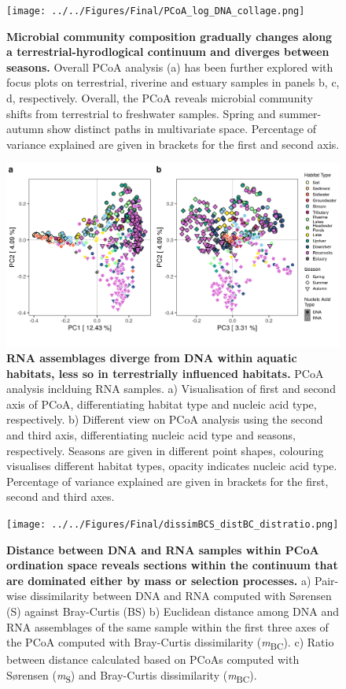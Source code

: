 \documentclass[12pt,a4paper]{article} %
\begin{document}
\begin{figure}[!ht]
\centering
\texttt{[image: ../../Figures/Final/PCoA\_log\_DNA\_collage.png]}
\caption{\textbf{Microbial community composition gradually changes along a terrestrial-hyrodlogical continuum and diverges between seasons.} Overall PCoA analysis (a) has been further explored with focus plots on terrestrial, riverine and estuary samples in panels b, c, d, respectively. Overall, the PCoA reveals microbial community shifts from terrestrial to freshwater samples. Spring and summer-autumn show distinct paths in multivariate space. Percentage of variance explained are given in brackets for the first and second axis.}
\end{figure}

\begin{figure}[!ht]
\centering
\includegraphics[width=17cm]{../../Figures/Final/PCoA_all_SampleType.png}
\caption{\textbf{RNA assemblages diverge from DNA within aquatic habitats, less so in terrestrially influenced habitats.} PCoA analysis inclduing RNA samples. a) Visualisation of first and second axis of PCoA, differentiating habitat type and nucleic acid type, respectively. b) Different view on PCoA analysis using the second and third axis, differentiating nucleic acid type and seasons, respectively. Seasons are given in different point shapes, colouring visualises different habitat types, opacity indicates nucleic acid type. Percentage of variance explained are given in brackets for the first, second and third axes.}
\end{figure}

\begin{figure}[!ht]
\centering
\texttt{[image: ../../Figures/Final/dissimBCS\_distBC\_distratio.png]}
\caption{\textbf{Distance between DNA and RNA samples within PCoA ordination space reveals sections within the continuum that are dominated either by mass or selection processes.} a) Pair-wise dissimilarity between DNA and RNA computed with S{\o}rensen (S) against Bray-Curtis (BS) b) Euclidean distance among DNA and RNA assemblages of the same sample within the first three axes of the PCoA computed with Bray-Curtis dissimilarity (\textit{m}\textsubscript{BC}). c) Ratio between distance calculated based on PCoAs computed with S{\o}rensen (\textit{m}\textsubscript{S}) and Bray-Curtis dissimilarity (\textit{m}\textsubscript{BC}).}
\end{figure}
\end{document}
